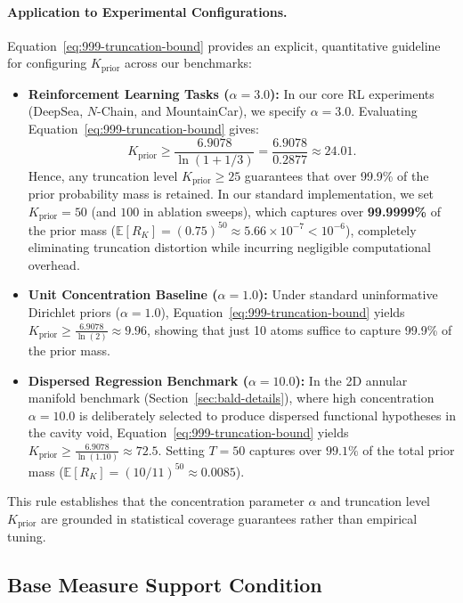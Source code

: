 \documentclass[10pt]{article}
\begin{document}
\paragraph{Application to Experimental Configurations.}
Equation~\eqref{eq:999-truncation-bound} provides an explicit, quantitative guideline for configuring $K_{\text{prior}}$ across our benchmarks:
\begin{itemize}[leftmargin=*,noitemsep]
\item \textbf{Reinforcement Learning Tasks ($\alpha = 3.0$):} In our core RL experiments (DeepSea, $N$-Chain, and MountainCar), we specify $\alpha = 3.0$. Evaluating Equation~\eqref{eq:999-truncation-bound} gives:
\begin{equation}
K_{\text{prior}} \ge \frac{6.9078}{\ln(1 + 1/3)} = \frac{6.9078}{0.2877} \approx 24.01.
\end{equation}
Hence, any truncation level $K_{\text{prior}} \ge 25$ guarantees that over 99.9\% of the prior probability mass is retained. In our standard implementation, we set $K_{\text{prior}} = 50$ (and $100$ in ablation sweeps), which captures over \textbf{99.9999\%} of the prior mass ($\mathbb{E}[R_K] = (0.75)^{50} \approx 5.66 \times 10^{-7} < 10^{-6}$), completely eliminating truncation distortion while incurring negligible computational overhead.
\item \textbf{Unit Concentration Baseline ($\alpha = 1.0$):} Under standard uninformative Dirichlet priors ($\alpha = 1.0$), Equation~\eqref{eq:999-truncation-bound} yields $K_{\text{prior}} \ge \frac{6.9078}{\ln(2)} \approx 9.96$, showing that just 10 atoms suffice to capture 99.9\% of the prior mass.
\item \textbf{Dispersed Regression Benchmark ($\alpha = 10.0$):} In the 2D annular manifold benchmark (Section~\ref{sec:bald-details}), where high concentration $\alpha = 10.0$ is deliberately selected to produce dispersed functional hypotheses in the cavity void, Equation~\eqref{eq:999-truncation-bound} yields $K_{\text{prior}} \ge \frac{6.9078}{\ln(1.10)} \approx 72.5$. Setting $T = 50$ captures over $99.1\%$ of the total prior mass ($\mathbb{E}[R_K] = (10/11)^{50} \approx 0.0085$).
\end{itemize}
This rule establishes that the concentration parameter $\alpha$ and truncation level $K_{\text{prior}}$ are grounded in statistical coverage guarantees rather than empirical tuning.

\subsection{Base Measure Support Condition}
\label{sec:support-condition-dp}
\end{document}
